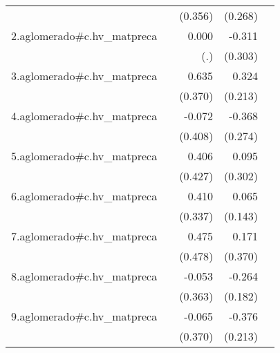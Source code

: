 {\begin{longtable}{l*{4}{D{.}{.}{-1}}}
            &                     &     (0.356)         &     (0.268)         &                     \\
\addlinespace
2.aglomerado#c.hv\_matpreca&                     &       0.000         &      -0.311         &                     \\
            &                     &         (.)         &     (0.303)         &                     \\
\addlinespace
3.aglomerado#c.hv\_matpreca&                     &       0.635         &       0.324         &                     \\
            &                     &     (0.370)         &     (0.213)         &                     \\
\addlinespace
4.aglomerado#c.hv\_matpreca&                     &      -0.072         &      -0.368         &                     \\
            &                     &     (0.408)         &     (0.274)         &                     \\
\addlinespace
5.aglomerado#c.hv\_matpreca&                     &       0.406         &       0.095         &                     \\
            &                     &     (0.427)         &     (0.302)         &                     \\
\addlinespace
6.aglomerado#c.hv\_matpreca&                     &       0.410         &       0.065         &                     \\
            &                     &     (0.337)         &     (0.143)         &                     \\
\addlinespace
7.aglomerado#c.hv\_matpreca&                     &       0.475         &       0.171         &                     \\
            &                     &     (0.478)         &     (0.370)         &                     \\
\addlinespace
8.aglomerado#c.hv\_matpreca&                     &      -0.053         &      -0.264         &                     \\
            &                     &     (0.363)         &     (0.182)         &                     \\
\addlinespace
9.aglomerado#c.hv\_matpreca&                     &      -0.065         &      -0.376         &                     \\
            &                     &     (0.370)         &     (0.213)         &                     \\

\end{longtable}}
